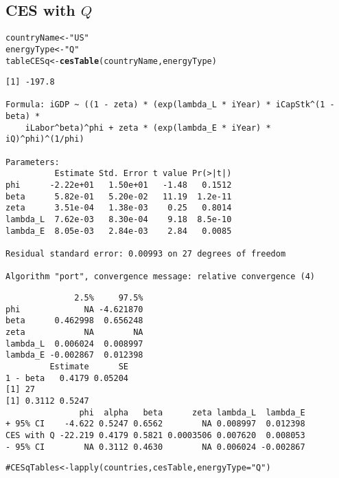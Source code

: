 \documentclass[preprint,authoryear,12pt]{elsarticle}\usepackage{graphicx, color}
\makeatletter
\newcommand{\hlfunctioncall}[1]{\textcolor[rgb]{0.501960784313725,0,0.329411764705882}{\textbf{#1}}}%
\newcommand{\hlstring}[1]{\textcolor[rgb]{0.6,0.6,1}{#1}}%
\newcommand{\hlcomment}[1]{\textcolor[rgb]{0.180392156862745,0.6,0.341176470588235}{#1}}%
\newenvironment{kframe}{%
 \def\at@end@of@kframe{}%
 \ifinner\ifhmode%
  \def\at@end@of@kframe{\end{minipage}}%
  \begin{minipage}{\columnwidth}%
 \fi\fi%
 \def\FrameCommand##1{\hskip\@totalleftmargin \hskip-\fboxsep
 \colorbox{shadecolor}{##1}\hskip-\fboxsep
     \hskip-\linewidth \hskip-\@totalleftmargin \hskip\columnwidth}%
 \MakeFramed {\advance\hsize-\width
   \@totalleftmargin\z@ \linewidth\hsize
   \@setminipage}}%
 {\par\unskip\endMakeFramed%
 \at@end@of@kframe}
\newenvironment{knitrout}{}{} %
\makeatother
\begin{document}
\subsection{CES with $Q$}
\begin{knitrout}
\color{fgcolor}\begin{kframe}
\begin{alltt}
countryName <- \hlstring{"US"}
energyType <- \hlstring{"Q"}
tableCESq <- \hlfunctioncall{cesTable}(countryName, energyType)
\end{alltt}
\begin{verbatim}
[1] -197.8

Formula: iGDP ~ ((1 - zeta) * (exp(lambda_L * iYear) * iCapStk^(1 - beta) * 
    iLabor^beta)^phi + zeta * (exp(lambda_E * iYear) * iQ)^phi)^(1/phi)

Parameters:
          Estimate Std. Error t value Pr(>|t|)
phi      -2.22e+01   1.50e+01   -1.48   0.1512
beta      5.82e-01   5.20e-02   11.19  1.2e-11
zeta      3.51e-04   1.38e-03    0.25   0.8014
lambda_L  7.62e-03   8.30e-04    9.18  8.5e-10
lambda_E  8.05e-03   2.84e-03    2.84   0.0085

Residual standard error: 0.00993 on 27 degrees of freedom

Algorithm "port", convergence message: relative convergence (4) 
\end{verbatim}


{\ttfamily\noindent\itshape\color{messagecolor}{Waiting for profiling to be done...}}\begin{verbatim}
              2.5%     97.5%
phi             NA -4.621870
beta      0.462998  0.656248
zeta            NA        NA
lambda_L  0.006024  0.008997
lambda_E -0.002867  0.012398
         Estimate      SE
1 - beta   0.4179 0.05204
[1] 27
[1] 0.3112 0.5247
               phi  alpha   beta      zeta lambda_L  lambda_E
+ 95% CI    -4.622 0.5247 0.6562        NA 0.008997  0.012398
CES with Q -22.219 0.4179 0.5821 0.0003506 0.007620  0.008053
- 95% CI        NA 0.3112 0.4630        NA 0.006024 -0.002867
\end{verbatim}
\begin{alltt}

\hlcomment{#CESqTables <- lapply(countries, cesTable, energyType="Q")}
\end{alltt}
\end{kframe}
\end{knitrout}
\end{document}
